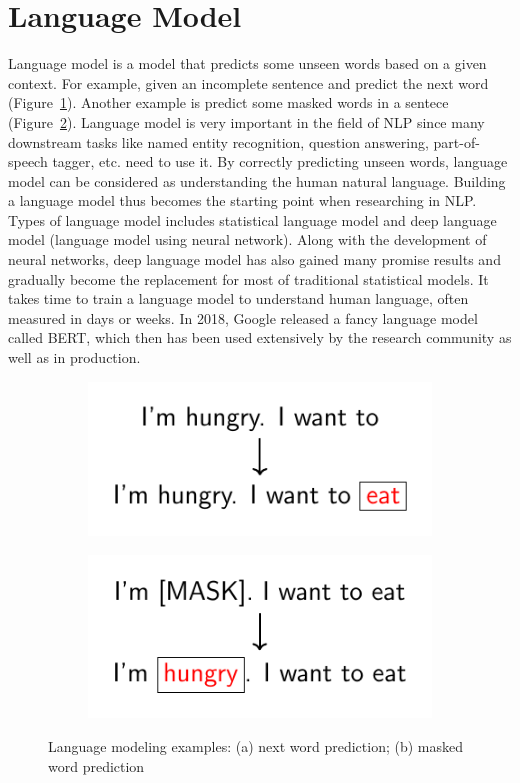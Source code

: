 \documentclass[12pt, sort&compress]{report}
\begin{document}
\section{Language Model}
\label{sec:02}
Language model is a model that predicts some unseen words based on a given context. For example, given an incomplete sentence and predict the next word (Figure~\ref{fig:add:01:a}). Another example is predict  some masked words in a sentece (Figure~\ref{fig:add:01:b}). Language model is very important in the field of NLP since many downstream tasks like named entity recognition, question answering, part-of-speech tagger, etc. need to use it. By correctly predicting unseen words, language model can be considered as understanding the human natural language. Building a language model thus becomes the starting point  when researching in NLP. Types of language model includes statistical language model and deep language model (language model using neural network).  Along with the development of neural networks, deep language model has also gained many promise results and gradually become the replacement for most of traditional statistical models. It takes time to train a language model to understand human language, often measured in days or weeks. In 2018, Google released a fancy language model called BERT, which then has been used extensively by the research community as well as in production.
\begin{figure}[!htbp]
\begin{subfigure}{.5\linewidth}
	\centering
	\includegraphics[scale=1.]{images/PDF/langModel/nextWord.pdf}
	\caption{}
	\label{fig:add:01:a}
\end{subfigure}
\begin{subfigure}{.5\linewidth}
	\centering
	\includegraphics[scale=1.]{images/PDF/langModel/maskedWord.pdf}
	\caption{}
	\label{fig:add:01:b}
\end{subfigure}
\caption{Language modeling examples: (a) next word prediction; (b) masked word prediction}
\label{fig:add:01}
\end{figure}
\end{document}
